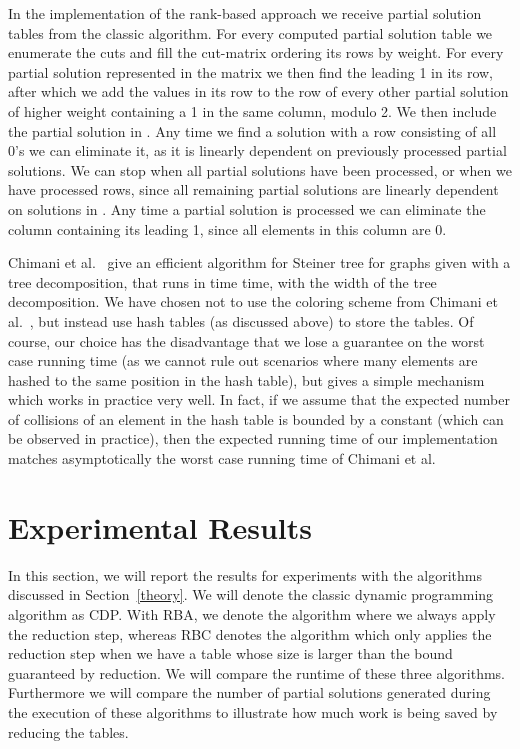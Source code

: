 \documentclass{llncs}
\begin{document}
In the implementation of the rank-based approach we receive partial solution tables from the classic algorithm.
For every computed partial solution table we enumerate the cuts and fill the cut-matrix ordering its rows by weight. For every partial solution represented in the matrix we then find the leading 1 in its row, after which we add the values in its row to the row of every other partial solution of higher weight containing a 1 in the same column, modulo 2. We then include the partial solution in . Any time we find a solution with a row consisting of all 0's we can eliminate it, as it is linearly dependent on previously processed partial solutions. We can stop when all partial solutions have been processed, or when we have processed  rows, since all remaining partial solutions are linearly dependent on solutions in . Any time a partial solution is processed we can eliminate the column containing its leading 1, since all elements in this column are 0.

Chimani et al.~\cite{ChimaniMZ12} give an efficient algorithm for Steiner tree for graphs given with a tree decomposition,
that runs in time  time, with  the width of the tree decomposition. We have chosen not to use the
coloring scheme from Chimani et al.~\cite{ChimaniMZ12}, but instead use hash tables (as discussed above) to store the 
tables. Of course, our choice has the disadvantage that we lose a guarantee on the worst case running time (as we cannot
rule out scenarios where many elements are hashed to the same position in the hash table), but gives a simple mechanism
which works in practice very well. In fact, if we assume that the expected number of collisions of an element in the hash
table is bounded by a constant (which can be observed in practice), then the expected running time of our implementation
matches asymptotically  the worst case running time of Chimani et al.

\section{Experimental Results}
\label{section:results}
In this section, we will report the results for experiments with the algorithms discussed in Section~\ref{theory}. We will denote the classic dynamic programming algorithm as CDP. 
With RBA, we denote the algorithm where we always apply the reduction step,
whereas RBC denotes the algorithm which only applies the reduction step when we have a table whose size is larger than the bound guaranteed by reduction.
We will compare the runtime of these three algorithms. 
Furthermore we will compare the number of partial solutions generated during the execution of these algorithms to illustrate how much work is being saved by reducing the tables.
\end{document}

